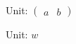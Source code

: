 \documentclass{ctexart}
\begin{document}
Unit: $ \begin{pmatrix}a&b\end{pmatrix}$

Unit: $ w$
\end{document}

